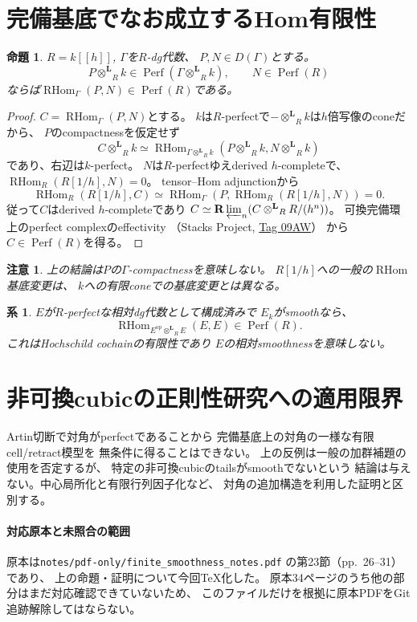 \documentclass[a4paper,11pt]{ltjsarticle}
\newtheorem{proposition}[theorem]{命題}
\newtheorem{corollary}[theorem]{系}
\newtheorem{remark}[theorem]{注意}
\newcommand{\Perf}{\operatorname{Perf}}
\newcommand{\RHom}{\operatorname{RHom}}
\newcommand{\otL}{\mathbin{\otimes^{\mathbf L}}}
\begin{document}
\section{完備基底でなお成立するHom有限性}
\begin{proposition}\label{prop:hom}
$R=k[[h]]$, $\Gamma$を$R$-dg代数、
$P,N\in D(\Gamma)$とする。
\[
P\otL_Rk\in\Perf(\Gamma\otL_Rk),\qquad
N\in\Perf(R)
\]
ならば$\RHom_\Gamma(P,N)\in\Perf(R)$である。
\end{proposition}
\begin{proof}
$C=\RHom_\Gamma(P,N)$とする。
$k$は$R$-perfectで$-\otL_Rk$は$h$倍写像のconeだから、
$P$のcompactnessを仮定せず
\[
C\otL_Rk\simeq
\RHom_{\Gamma\otL_Rk}(P\otL_Rk,N\otL_Rk)
\]
であり、右辺は$k$-perfect。
$N$は$R$-perfectゆえderived $h$-completeで、
$\RHom_R(R[1/h],N)=0$。
tensor--Hom adjunctionから
\[
\RHom_R(R[1/h],C)
\simeq\RHom_\Gamma(P,\RHom_R(R[1/h],N))=0.
\]
従って$C$はderived $h$-completeであり
$C\simeq\mathbf R\varprojlim_n(C\otL_RR/(h^n))$。
可換完備環上のperfect complexのeffectivity
（Stacks Project, \href{https://stacks.math.columbia.edu/tag/09AW}{Tag 09AW}）
から$C\in\Perf(R)$を得る。
\end{proof}
\begin{remark}
上の結論は$P$の$\Gamma$-compactnessを意味しない。
$R[1/h]$への一般の$\RHom$基底変更は、
$k$への有限coneでの基底変更とは異なる。
\end{remark}
\begin{corollary}
$E$が$R$-perfectな相対dg代数として構成済みで
$E_k$がsmoothなら、
\[
\RHom_{E^{\mathrm{op}}\otL_RE}(E,E)\in\Perf(R).
\]
これはHochschild cochainの有限性であり
$E$の相対smoothnessを意味しない。
\end{corollary}

\section{非可換cubicの正則性研究への適用限界}
Artin切断で対角がperfectであることから
完備基底上の対角の一様な有限cell/retract模型を
無条件に得ることはできない。
上の反例は一般の加群補題の使用を否定するが、
特定の非可換cubicのtailsがsmoothでないという
結論は与えない。中心局所化と有限行列因子化など、
対角の追加構造を利用した証明と区別する。

\paragraph{対応原本と未照合の範囲}
原本は\texttt{notes/pdf-only/finite\_smoothness\_notes.pdf}
の第23節（pp.~26--31）であり、
上の命題・証明について今回TeX化した。
原本34ページのうち他の部分はまだ対応確認できていないため、
このファイルだけを根拠に原本PDFをGit追跡解除してはならない。
\end{document}
